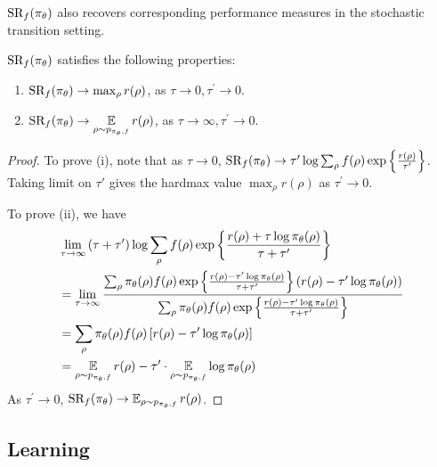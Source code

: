 $\text{SR}_f(\pi_\theta)$ also recovers corresponding performance measures in the stochastic transition setting.
\begin{prop}
\label{prop:sr_stochastic}
$\text{SR}_f(\pi_\theta)$ satisfies the following properties:
\begin{enumerate}[label=(\roman*)]
	\item  $\text{SR}_f(\pi_\theta) \to \max_{\rho}{r(\rho)}$, as $\tau \to 0, \tau^{\prime} \to 0$.
	\item $\text{SR}_f(\pi_\theta) \to \operatorname*{\mathbb{E}}\limits_{\rho \sim p_{\pi_\theta, f}}{r(\rho)}$, as $\tau \to \infty, \tau^{\prime} \to 0$. 
\end{enumerate}	
\end{prop}
\begin{proof}
To prove (i), note that as $\tau \to 0$, $\text{SR}_f(\pi_\theta) \to \tau^{\prime} \log{ \sum_{\rho}{ f(\rho) \exp\left\{ \frac{r(\rho) }{ \tau^{\prime} } \right\} }}$. Taking limit on $\tau'$ gives the hardmax value $\max_{\rho}{r(\rho)}$ as $\tau^{\prime} \to 0$.
	
To prove (ii), we have 
\begin{align*}
	&\lim\limits_{\tau \to \infty}{ (\tau + \tau^{\prime})\log{ \sum_{\rho}{ f(\rho) \exp\left\{ \frac{r(\rho) + \tau \log{\pi_\theta(\rho)} }{\tau + \tau^{\prime}} \right\} }} } \\
	&= \lim\limits_{\tau \to \infty}{ \frac{ \sum_{\rho}{ \pi_\theta(\rho) f(\rho) \exp\left\{ \frac{r(\rho) - \tau^{\prime} \log{\pi_\theta(\rho)} }{\tau + \tau^{\prime}} \right\} \left( r(\rho) - \tau^{\prime}\log{\pi_\theta(\rho)} \right) } }{  \sum_{\rho}{ \pi_\theta(\rho) f(\rho) \exp\left\{ \frac{r(\rho) - \tau^{\prime} \log{\pi_\theta(\rho)} }{\tau + \tau^{\prime}} \right\} } } } \\
	&= \sum_{\rho}{ \pi_\theta(\rho) f(\rho) \left[ r(\rho) - \tau^{\prime}\log{\pi_\theta(\rho)} \right] } \\
	&= \operatorname*{\mathbb{E}}\limits_{\rho \sim p_{\pi_\theta, f}}{r(\rho)} -  \tau^{\prime} \cdot \operatorname*{\mathbb{E}}\limits_{\rho \sim p_{\pi_\theta, f}}{  \log{\pi_\theta(\rho)} }
\end{align*}
As $\tau^{\prime} \to 0$, $\text{SR}_f(\pi_\theta) \to \operatorname*{\mathbb{E}}_{\rho \sim p_{\pi_\theta, f}}{r(\rho)}$.
\end{proof}

\subsection{Learning}

